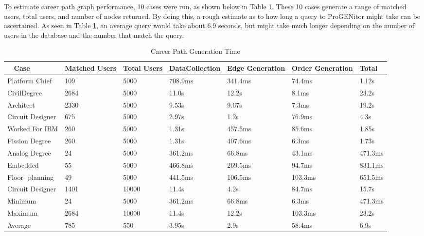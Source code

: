 To estimate career path graph performance, 10 cases were run, as shown below in
Table \ref{table:career performance}.  These 10 cases generate a range of
matched users, total users, and number of nodes returned.  By doing this, a rough
estimate as to how long a query to ProGENitor might take can be ascertained.  As
seen in Table \ref{table:career performance}, an average query would take about
6.9 seconds, but might take much longer depending on the number of users in the
database and the number that match the query.

\begin{table}[H]
  \centering
  \begin{tabular}{|p{17mm}|p{16mm}|p{10mm}|p{18mm}|p{19mm}|p{20mm}|p{14mm}|}
  \hline
  \
  Case&Matched Users&Total Users&Data\newline Collection&Edge\newline
  Generation&Order Generation&Total\\
  \hline\hline
  Platform Chief&109&5000&708.9ms&341.4ms&74.4ms&1.12s\\ \hline
  Civil\newline Degree&2684&5000&11.0s&12.2s&8.1ms&23.2s\\ \hline 
  Architect&2330&5000&9.53s&9.67s&7.3ms&19.2s\\ \hline
  Circuit Designer&675&5000&2.97s&1.2s&76.9ms&4.3s\\ \hline
  Worked For IBM&260&5000&1.31s&457.5ms&85.6ms&1.85s\\ \hline
  Fission Degree&260&5000&1.31s&407.6ms&6.3ms&1.73s\\ \hline
  Analog Degree&24&5000&361.2ms&66.8ms&43.1ms&471.3ms\\ \hline
  Embedded&55&5000&466.8ms&269.5ms&94.7ms&831.1ms\\ \hline
  Floor- \newline planning&49&5000&441.5ms&106.5ms&103.3ms&651.5ms\\ \hline
  Circuit Designer&1401&10000&11.4s&4.2s&84.7ms&15.7s\\ \hline
  \hline\hline
  Minimum&24&5000&361.2ms&66.8ms&6.3ms&471.3ms\\ \hline
  Maximum&2684&10000&11.4s&12.2s&103.3ms&23.2s\\ \hline
  Average&785&550&3.95s&2.9s&58.4ms&6.9s\\ \hline
  \end{tabular}
  \caption{Career Path Generation Time}
  \label{table:career performance}
\end{table}

